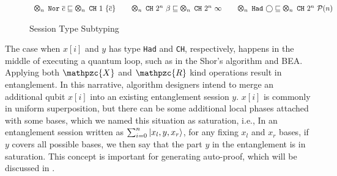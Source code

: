 \begin{figure}[t]
{\small
$
\begin{array}{l}
\ttype{n}{\tnor{\overline{c}}} \sqsubseteq \ttype{n}{\tch{1}{\{\overline{c}\}}}
\qquad 
\ttype{n}{\tch{2^n}{\beta}} \sqsubseteq \ttype{n}{\tch{2^n}{\infty}}
\qquad 
\ttype{n}{\thad{\bigcirc}} \sqsubseteq \ttype{n}{\tch{2^n}{\tpower{n}}}
\end{array}
$
}
  \caption{Session Type Subtyping}
  \label{fig:exp-subtyping}
\end{figure}

The case when $x[i]$ and $y$ has type \texttt{Had} and \texttt{CH}, respectively,
happens in the middle of executing a quantum loop, such as in the Shor's algorithm and BEA.
Applying both $\mathpzc{X}$ and $\mathpzc{R}$ kind operations result in entanglement.
In this narrative, algorithm designers intend to
merge an additional qubit $x[i]$ into an existing entanglement session $y$.
$x[i]$ is commonly in uniform superposition,
but there can be some additional local phases attached with some bases,
which we named this situation as saturation, i.e.,
In an entanglement session written as $\sum_{i=0}^n \left\vert{x_l,y,x_r}\right\rangle$,
for any fixing $x_l$ and $x_r$ bases, if $y$ covers all possible bases,
we then say that the part $y$ in the entanglement is in saturation.
This concept is important for generating auto-proof, which will be discussed in .

